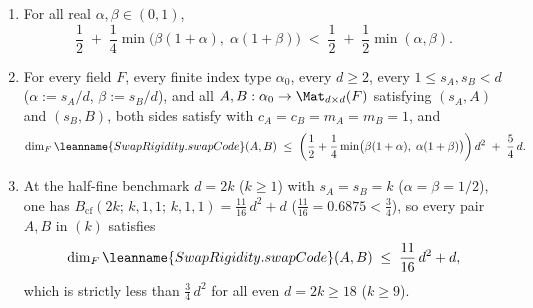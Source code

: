 \begin{corollary}\label{cor:two-sided-win}
\begin{enumerate}[label=(\alph*)]
\item For all real $\alpha, \beta \in (0, 1)$,
  \[
    \frac{1}{2} \;+\; \frac{1}{4}\min\bigl(\beta(1 + \alpha),\; \alpha(1 + \beta)\bigr)
    \;<\;
    \frac{1}{2} \;+\; \frac{1}{2}\min(\alpha, \beta).
  \]
\item For every field $F$, every finite index type $\alpha_0$, every $d \ge 2$, every
  $1 \le s_A, s_B < d$ ($\alpha := s_A / d$, $\beta := s_B / d$), and all
  $A, B : \alpha_0 \to \Mat_{d\times d}(F)$ satisfying
   $(s_A, A)$ and  $(s_B, B)$, both
  sides satisfy  with $c_A = c_B = m_A = m_B = 1$, and
  \[
    \dim_F \leanname{SwapRigidity.swapCode}(A, B)
    \;\le\;
    \left(\frac{1}{2} + \frac{1}{4}\min\bigl(\beta(1 + \alpha),\; \alpha(1 + \beta)\bigr)\right) d^2
    \;+\; \frac{5}{4}\,d.
  \]
\item At the half-fine benchmark $d = 2k$ ($k \ge 1$) with $s_A = s_B = k$ ($\alpha = \beta = 1/2$),
  one has $B_{\mathrm{cf}}(2k;\, k, 1, 1;\, k, 1, 1) = \frac{11}{16}\,d^2 + d$
  ($\frac{11}{16} = 0.6875 < \frac{3}{4}$), so every pair $A, B$ in
   $(k)$ satisfies
  \[
    \dim_F \leanname{SwapRigidity.swapCode}(A, B) \;\le\; \frac{11}{16}\,d^2 + d,
  \]
  which is strictly less than $\frac{3}{4}\,d^2$ for all even $d = 2k \ge 18$ ($k \ge 9$).
\end{enumerate}
\end{corollary}
